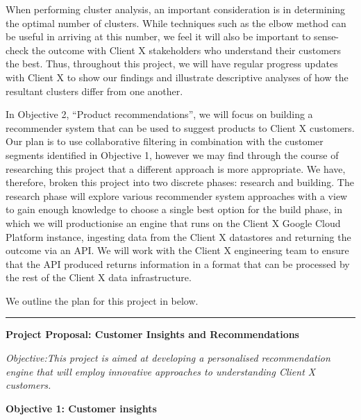 \documentclass[
]{book}
\begin{document}
When performing cluster analysis, an important consideration is in determining the optimal number of clusters. While techniques such as the elbow method can be useful in arriving at this number, we feel it will also be important to sense-check the outcome with Client X stakeholders who understand their customers the best. Thus, throughout this project, we will have regular progress updates with Client X to show our findings and illustrate descriptive analyses of how the resultant clusters differ from one another.

In Objective 2, ``Product recommendations'', we will focus on building a recommender system that can be used to suggest products to Client X customers. Our plan is to use collaborative filtering in combination with the customer segments identified in Objective 1, however we may find through the course of researching this project that a different approach is more appropriate. We have, therefore, broken this project into two discrete phases: research and building. The research phase will explore various recommender system approaches with a view to gain enough knowledge to choose a single best option for the build phase, in which we will productionise an engine that runs on the Client X Google Cloud Platform instance, ingesting data from the Client X datastores and returning the outcome via an API. We will work with the Client X engineering team to ensure that the API produced returns information in a format that can be processed by the rest of the Client X data infrastructure.

We outline the plan for this project in below.

\begin{center}\rule{0.5\linewidth}{0.5pt}\end{center}

\textbf{Project Proposal: Customer Insights and Recommendations}

\emph{Objective:This project is aimed at developing a personalised recommendation engine that will employ innovative approaches to understanding Client X customers.}

\textbf{Objective 1: Customer insights}
\end{document}
